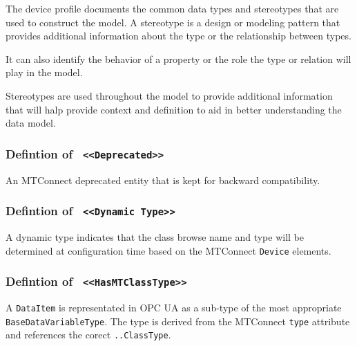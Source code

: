 \FloatBarrier


The device profile documents the common data types and stereotypes that are 
used to construct the model. A stereotype is a design or modeling pattern that 
provides additional information about the type or the relationship between types. 

It can also identify the behavior of a property or the role the type or relation
will play in the model. 

Stereotypes are used throughout the model to provide additional information that 
will halp provide context and definition to aid in better understanding the
data model.

\subsubsection{Defintion of \texttt{ <<Deprecated>>}}
  \label{type:Deprecated}

\FloatBarrier

An MTConnect deprecated entity that is kept for backward compatibility.

\FloatBarrier
\subsubsection{Defintion of \texttt{ <<Dynamic Type>>}}
  \label{type:Dynamic Type}

\FloatBarrier

A dynamic type indicates that the class browse name and type will be 
determined at configuration time based on the MTConnect \texttt{Device}
elements.

\FloatBarrier
\subsubsection{Defintion of \texttt{ <<HasMTClassType>>}}
  \label{type:HasMTClassType}

\FloatBarrier

A \texttt{DataItem} is representated in OPC UA as a sub-type of the most appropriate \texttt{BaseDataVariableType}. 
The type is derived from the MTConnect \texttt{type} attribute and references the corect \texttt{..ClassType}.

